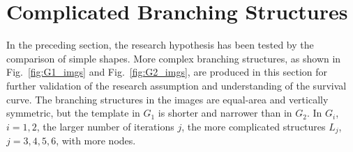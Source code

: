 \section{Complicated Branching Structures}



In the preceding section, the research hypothesis has been tested by
the comparison of simple shapes. More complex branching structures, as
shown in Fig.~\ref{fig:G1_imgs} and Fig.~\ref{fig:G2_imgs}, are
produced in this section for further validation of the research
assumption and understanding of the survival curve. The branching
structures in the images are equal-area and vertically symmetric, but
the template in $G_1$ is shorter and narrower than in $G_2$. In $G_i$,
$i=1, 2$, the larger number of iterations $j$, the more complicated
structures $L_j$, $j=3, 4, 5, 6$, with more nodes.






      

      
    






